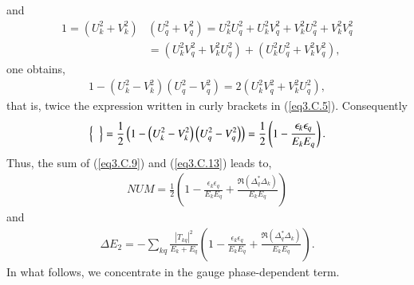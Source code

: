 and
\begin{align}
\nonumber 1=\left(U_k^2+V_k^2\right)&\left(U_q^2+V_q^2\right)=U_k^2U_q^2+U_k^2V_q^2+V_k^2U_q^2+V_k^2V_q^2\\
&=\left(U_k^2V_q^2+V_k^2U_q^2\right)+\left(U_k^2U_q^2+V_k^2V_q^2\right),
\end{align}
one obtains,
\begin{align}
1-\left(U_k^2-V_k^2\right)\left(U_q^2-V_q^2\right)=2\left(U_k^2V_q^2+V_k^2U_q^2\right),
\end{align}
that is, twice the expression written in curly brackets in (\ref{eq3.C.5}). Consequently
\begin{align}\label{eq3.C.13}
\left\{\vphantom{\left(U_q^2-V_q^2\right)}\;\;\right\}=\frac{1}{2}\left(1-\left(U_k^2-V_k^2\right)\left(U_q^2-V_q^2\right)\right)=\frac{1}{2}\left(1-\frac{\epsilon_k\epsilon_q}{E_kE_q}\right).
\end{align}
Thus, the sum of (\ref{eq3.C.9}) and (\ref{eq3.C.13}) leads to,
\begin{align}
NUM=\frac{1}{2}\left(1-\frac{\epsilon_k\epsilon_q}{E_kE_q}+\frac{\Re(\Delta_q^*\Delta_k)}{E_kE_q}\right)
\end{align}
and
\begin{align}
\Delta E_2=-\sum_{kq}\frac{|T_{kq}|^2}{E_k+E_q}\left(1-\frac{\epsilon_k\epsilon_q}{E_kE_q}+\frac{\Re(\Delta_q^*\Delta_k)}{E_kE_q}\right).
\end{align}
In what follows, we concentrate in the gauge phase-dependent term. 




